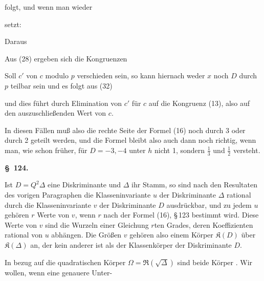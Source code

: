 folgt, und wenn man wieder


setzt:


Daraus


Aus (28) ergeben sich die Kongruenzen


Soll $c'$ von $c$ modulo $p$ verschieden sein, so kann hiernach weder $x$ noch $D$ durch $p$ teilbar sein und es folgt aus (32)


und dies führt durch Elimination von $c'$ für $c$ auf die Kongruenz (13), also auf den auszuschließenden Wert von $c$.


In diesen Fällen muß also die rechte Seite der Formel (16) noch durch 3 oder durch 2 geteilt werden, und die Formel bleibt also auch dann noch richtig, wenn man, wie schon früher, für $D=-3, -4$ unter $h$ nicht 1, sondern $\frac{1}{3}$ und $\frac{1}{2}$ versteht.

\begin{center}
\textbf{\S\ 124. }
\end{center}

Ist $D=Q^2\Delta$ eine Diskriminante und $\Delta$ ihr Stamm, so sind nach den Resultaten des vorigen Paragraphen die Klasseninvariante $u$ der Diskriminante $\Delta$ rational durch die Klasseninvariante $v$ der Diskriminante $D$ ausdrückbar, und zu jedem $u$ gehören $r$ Werte von $v$, wenn $r$ nach der Formel (16), \S\,123 bestimmt wird. Diese Werte von $v$ sind die Wurzeln einer Gleichung $r$ten Grades, deren Koeffizienten rational von $u$ abhängen. Die Größen $v$ gehören also einem Körper $\mathfrak{K}(D)$ über $\mathfrak{K}(\Delta)$ an, der kein anderer ist als der Klassenkörper der Diskriminante $D$.

In bezug auf die quadratischen Körper $\Omega=\mathfrak{R}(\sqrt{\Delta})$ sind beide Körper . Wir wollen, wenn eine genauere Unter-
